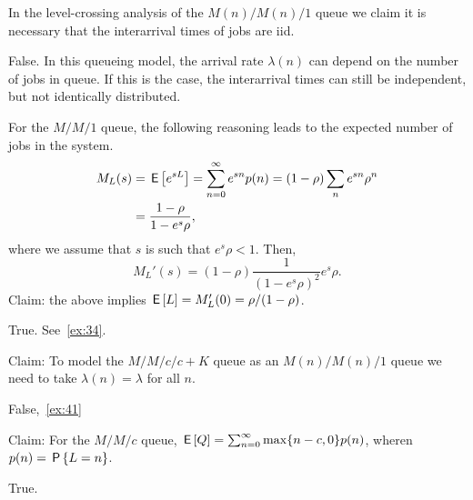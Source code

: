 \documentclass[stochastic-or.tex]{subfiles}
\begin{document}

\begin{truefalse}
In the level-crossing analysis of the $M(n)/M(n)/1$ queue we claim it is necessary that the interarrival times of jobs are iid.
\begin{solution}
False. In this queueing model, the arrival rate $\lambda(n)$ can depend on the number of jobs in queue. If this is the case, the interarrival times can still be independent, but not identically distributed.
\end{solution}
\end{truefalse}

\begin{truefalse}
For the $M/M/1$ queue, the following reasoning leads to the expected number of jobs in the system.
\begin{equation*}
 \begin{split}
 M_L(s)
&= \E{e^{s L}} = \sum_{n=0}^\infty e^{s n}p(n) = (1-\rho) \sum_n e^{s n} \rho^n \\
&=\frac{1-\rho}{1-e^{s}\rho},
 \end{split}
\end{equation*}
where we assume that $s$ is such that $e^s \rho < 1$. Then,
\begin{equation*}
 M_L'(s) = (1-\rho) \frac{1}{(1-e^s\rho)^2} e^s \rho.
\end{equation*}
Claim: the above implies  $\E L = M_L'(0) = \rho/(1-\rho)$.
\begin{solution}
True. See~\cref{ex:34}.
\end{solution}
\end{truefalse}

\begin{truefalse}
Claim: To model the $M/M/c/c+K$ queue as an $M(n)/M(n)/1$ queue we need to take $\lambda(n) = \lambda$ for all $n$.
\begin{solution} False,~\cref{ex:41}
\end{solution}
\end{truefalse}

\begin{truefalse}
Claim: For the $M/M/c$ queue, $\E{\QQ} = \sum_{n=0}^\infty \max\{n-c, 0\} p(n)$, wheren $p(n) = \P{L=n}$.
\begin{solution}
True.
\end{solution}
\end{truefalse}
\end{document}
